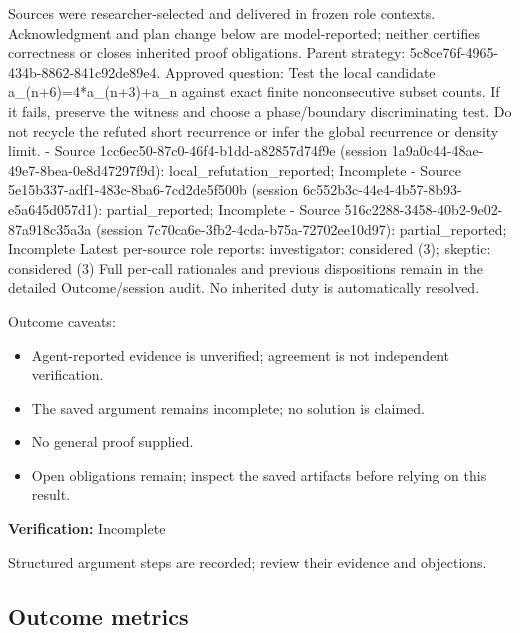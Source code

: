 \documentclass[11pt]{article}
\begin{document}
Sources were researcher-selected and delivered in frozen role contexts. Acknowledgment and plan change below are model-reported; neither certifies correctness or closes inherited proof obligations.
Parent strategy: 5c8ce76f-4965-434b-8862-841c92de89e4. Approved question: Test the local candidate a\_(n+6)=4*a\_(n+3)+a\_n against exact finite nonconsecutive subset counts. If it fails, preserve the witness and choose a phase/boundary discriminating test. Do not recycle the refuted short recurrence or infer the global recurrence or density limit.
- Source 1cc6ec50-87c0-46f4-b1dd-a82857d74f9e (session 1a9a0c44-48ae-49e7-8bea-0e8d47297f9d): local\_refutation\_reported; Incomplete
- Source 5e15b337-adf1-483c-8ba6-7cd2de5f500b (session 6c552b3c-44e4-4b57-8b93-e5a645d057d1): partial\_reported; Incomplete
- Source 516c2288-3458-40b2-9e02-87a918c35a3a (session 7c70ca6e-3fb2-4cda-b75a-72702ee10d97): partial\_reported; Incomplete
Latest per-source role reports: investigator: considered (3); skeptic: considered (3)
Full per-call rationales and previous dispositions remain in the detailed Outcome/session audit. No inherited duty is automatically resolved.\par
Outcome caveats:\par
\begin{itemize}
\item Agent-reported evidence is unverified; agreement is not independent verification.
\item The saved argument remains incomplete; no solution is claimed.
\item No general proof supplied.
\item Open obligations remain; inspect the saved artifacts before relying on this result.
\end{itemize}
\textbf{Verification:} Incomplete\par
Structured argument steps are recorded; review their evidence and objections.\par
\subsection{Outcome metrics}
\end{document}
